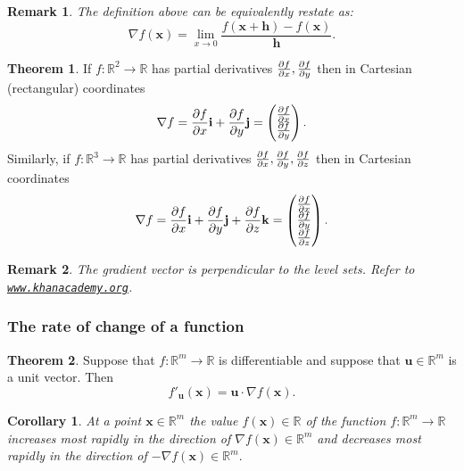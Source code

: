 \documentclass[12pt, a4paper]{article}
\newcommand{\bb}[1]{\mathbb{#1}}
\newcommand{\f}[2]{\frac{#1}{#2}}
\newcommand{\mb}[1]{\mathbf{#1}}
\newtheorem*{remark}{Remark}
\theoremstyle{definition}
\newtheorem{theorem}{Theorem}[section]
\theoremstyle{plain}
\newtheorem{corollary}{Corollary}[theorem]
\begin{document}
\begin{remark}
The definition above can be equivalently restate as: $$\nabla f(\mb{x})=\lim_{x\to0} \f{f(\mb{x+h})-f(\mb{x})}{\mb{h}}.$$
\end{remark}

\begin{theorem}
If $f : \bb{R}^2 \to \bb{R}$ has partial derivatives $\pdv{f}{x} , \pdv{f}{y}$ then in Cartesian (rectangular) coordinates $$\nabla f = \pdv{f}{x}\mathbf{i}+\pdv{f}{y}\mathbf{j} = \begin{pmatrix}\pdv{f}{x} \\ \pdv{f}{y} \end{pmatrix}.$$ Similarly, if $f : \bb{R}^3 \to \bb{R}$ has partial derivatives $\pdv{f}{x} , \pdv{f}{y}, \pdv{f}{z}$ then in Cartesian coordinates $$\nabla f = \pdv{f}{x}\mathbf{i}+\pdv{f}{y}\mathbf{j}+\pdv{f}{z}\mathbf{k} = \begin{pmatrix}\pdv{f}{x} \\ \pdv{f}{y} \\ \pdv{f}{z}\end{pmatrix}.$$ 
\end{theorem}

\begin{remark}
The gradient vector is perpendicular to the level sets. 
Refer to \href{https://www.khanacademy.org/math/multivariable-calculus/multivariable-derivatives/partial-derivative-and-gradient-articles/a/the-gradient}{\nolinkurl{www.khanacademy.org}}.
\end{remark}

\subsubsection{The rate of change of a function}

\begin{theorem}
Suppose that $f : \bb{R}^m \to \bb{R}$ is differentiable and suppose that $\mathbf{u} \in \bb{R}^m$ is a unit vector. Then $$f'_{\mathbf{u}}(\mathbf{x})=\mathbf{u}\cdot \nabla f(\mathbf{x}).$$
\end{theorem}

\begin{corollary}
At a point $\mathbf{x} \in \bb{R}^m$ the value $f(\mathbf{x}) \in \bb{R}$ of the function $f:\bb{R}^m \to \bb{R}$ increases most rapidly in the direction of $\nabla f(\mathbf{x}) \in \bb{R}^m$ and decreases most rapidly in the direction of $-\nabla f(\mathbf{x}) \in \bb{R}^m.$
\end{corollary}
\end{document}
